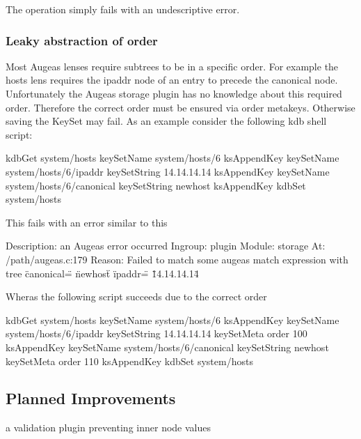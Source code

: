 The operation simply fails with an undescriptive error.

\subsubsection*{Leaky abstraction of order}

Most Augeas lenses require subtrees to be in a specific order. For example the hosts lens requires the ipaddr node of an entry to precede the canonical node. Unfortunately the Augeas storage plugin has no knowledge about this required order. Therefore the correct order must be ensured via order metakeys. Otherwise saving the Key\+Set may fail. As an example consider the following kdb shell script\+: \begin{DoxyVerb}kdbGet system/hosts
keySetName system/hosts/6
ksAppendKey
keySetName system/hosts/6/ipaddr
keySetString 14.14.14.14
ksAppendKey
keySetName system/hosts/6/canonical
keySetString newhost
ksAppendKey
kdbSet system/hosts
\end{DoxyVerb}


This fails with an error similar to this \begin{DoxyVerb}Description: an Augeas error occurred
Ingroup: plugin
Module: storage
At: /path/augeas.c:179
Reason: Failed to match
some augeas match expression
with tree
{ \"canonical\" = \"newhost\" } { \"ipaddr\" = \"14.14.14.14\" }
\end{DoxyVerb}


Wheras the following script succeeds due to the correct order \begin{DoxyVerb}kdbGet system/hosts
keySetName system/hosts/6
ksAppendKey
keySetName system/hosts/6/ipaddr
keySetString 14.14.14.14
keySetMeta order 100
ksAppendKey
keySetName system/hosts/6/canonical
keySetString newhost
keySetMeta order 110
ksAppendKey
kdbSet system/hosts
\end{DoxyVerb}


\subsection*{Planned Improvements}


\begin{DoxyItemize}
\item a validation plugin preventing inner node values 
\end{DoxyItemize}